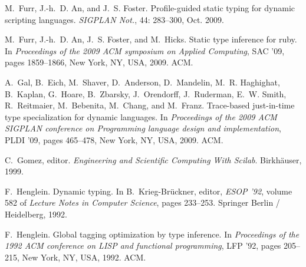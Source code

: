 \documentclass[9pt]{sigplanconf}
\begin{document}
\begin{thebibliography}{42}
M.~Furr, J.-h.~D. An, and J.~S. Foster.
\newblock Profile-guided static typing for dynamic scripting languages.
\newblock \emph{SIGPLAN Not.}, 44: 283--300, Oct. 2009{}.

M.~Furr, J.-h.~D. An, J.~S. Foster, and M.~Hicks.
\newblock Static type inference for ruby.
\newblock In \emph{Proceedings of the 2009 ACM symposium on Applied Computing},
  SAC '09, pages 1859--1866, New York, NY, USA, 2009{}. ACM.

A.~Gal, B.~Eich, M.~Shaver, D.~Anderson, D.~Mandelin, M.~R. Haghighat,
  B.~Kaplan, G.~Hoare, B.~Zbarsky, J.~Orendorff, J.~Ruderman, E.~W. Smith,
  R.~Reitmaier, M.~Bebenita, M.~Chang, and M.~Franz.
\newblock Trace-based just-in-time type specialization for dynamic languages.
\newblock In \emph{Proceedings of the 2009 ACM SIGPLAN conference on
  Programming language design and implementation}, PLDI '09, pages 465--478,
  New York, NY, USA, 2009. ACM.

C.~Gomez, editor.
\newblock \emph{Engineering and Scientific Computing With Scilab}.
\newblock Birkh{\"a}user, 1999.

F.~Henglein.
\newblock Dynamic typing.
\newblock In B.~Krieg-Brückner, editor, \emph{ESOP '92}, volume 582 of
  \emph{Lecture Notes in Computer Science}, pages 233--253. Springer Berlin /
  Heidelberg, 1992{}.

F.~Henglein.
\newblock Global tagging optimization by type inference.
\newblock In \emph{Proceedings of the 1992 ACM conference on LISP and
  functional programming}, LFP '92, pages 205--215, New York, NY, USA,
  1992{}. ACM.


\end{thebibliography}
\end{document}
